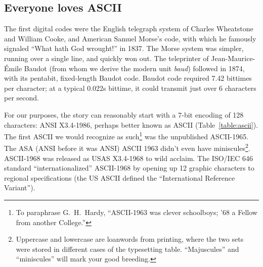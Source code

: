 \documentclass[letterpaper,10pt]{article}
\begin{document}
\subsection{Everyone loves ASCII}
\begin{figure}
\end{figure}
The first digital codes were the English telegraph system of Charles Wheatstone
and William Cooke, and American Samuel Morse's code, with which he famously
signaled ``What hath God wrought!'' in 1837. The Morse system was simpler, running
over a single line, and quickly won out. The teleprinter of Jean-Maurice-Émile Baudot
(from whom we derive the modern unit \textit{baud}) followed in 1874, with its pentabit,
fixed-length Baudot code. Baudot code required 7.42 bittimes per character; at
a typical 0.022s bittime, it could transmit just over 6 characters per second\cite{martin}.

For our purposes, the story can reasonably start with a 7-bit encoding of
128 characters: ANSI X3.4-1986, perhaps better known as ASCII (Table~\ref{table:ascii}).
The first ASCII we would recognize as such\footnote{To paraphrase G.\ H.\
Hardy, ``ASCII-1963 was clever schoolboys; '68 a Fellow from another
College\cite{ghhardy}.''} was the unpublished ASCII-1965. The ASA (ANSI
before it was ANSI) ASCII 1963 didn't even have miniscules\footnote{Uppercase
and lowercase are loanwords from printing, where the two sets were
stored in different cases of the typesetting table. ``Majuscules'' and
``miniscules'' will mark your good breeding.}. ASCII-1968 was
released as USAS X3.4-1968 to wild acclaim. The ISO/IEC 646 standard\cite{iso646}
``internationalized'' ASCII-1968 by opening up 12 graphic characters to
regional specifications (the US ASCII defined the ``International Reference
Variant'')\cite{aivosto}.
\end{document}
